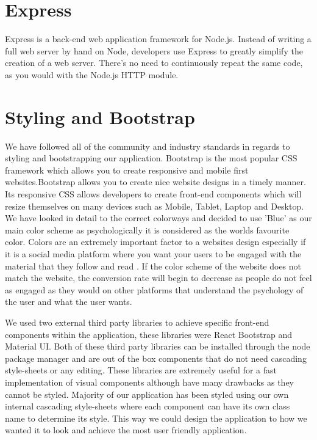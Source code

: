 \section{Express}
Express is a back-end web application framework for Node.js. Instead of writing a full web server by hand on Node, developers use Express to greatly simplify the creation of a web server. There’s no need to continuously repeat the same code, as you would with the Node.js HTTP module.

\section{Styling and Bootstrap}
We have followed all of the community and industry standards in regards to styling and bootstrapping our application. Bootstrap is the most popular CSS framework which allows you to create responsive and mobile first websites.Bootstrap allows you to create nice website designs in a timely manner. Its responsive CSS allows developers to create front-end components which will resize themselves on many devices such as Mobile, Tablet, Laptop and Desktop. We have looked in detail to the correct colorways and decided to use 'Blue' as our main color scheme as psychologically it is considered as the worlds favourite color. Colors are an extremely important factor to a websites design especially if it is a social media platform where you want your users to be engaged with the material that they follow and read \cite{singh2011impact}. If the color scheme of the website does not match the website, the conversion rate will begin to decrease as people do not feel as engaged as they would on other platforms that understand the psychology of the user and what the user wants.

We used two external third party libraries to achieve specific front-end components within the application, these libraries were React Bootstrap and Material UI. Both of these third party libraries can be installed through the node package manager and are out of the box components that do not need cascading style-sheets or any editing. These libraries are extremely useful for a fast implementation of visual components although have many drawbacks as they cannot be styled. Majority of our application has been styled using our own internal cascading style-sheets where each component can have its own class name to determine its style. This way we could design the application to how we wanted it to look and achieve the most user friendly application.

